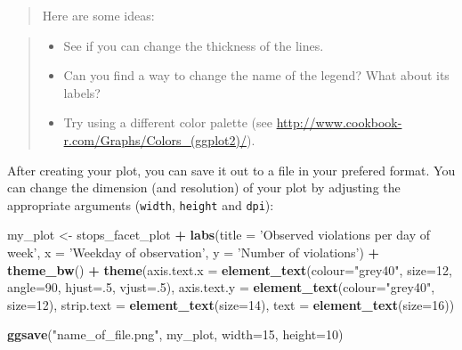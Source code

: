 \documentclass[]{book}
\newenvironment{Shaded}{\begin{snugshade}}{\end{snugshade}}
\newcommand{\KeywordTok}[1]{\textcolor[rgb]{0.13,0.29,0.53}{\textbf{#1}}}
\newcommand{\DataTypeTok}[1]{\textcolor[rgb]{0.13,0.29,0.53}{#1}}
\newcommand{\DecValTok}[1]{\textcolor[rgb]{0.00,0.00,0.81}{#1}}
\newcommand{\StringTok}[1]{\textcolor[rgb]{0.31,0.60,0.02}{#1}}
\newcommand{\OperatorTok}[1]{\textcolor[rgb]{0.81,0.36,0.00}{\textbf{#1}}}
\newcommand{\NormalTok}[1]{#1}
\providecommand{\tightlist}{%
  \setlength{\itemsep}{0pt}\setlength{\parskip}{0pt}}
\theoremstyle{definition}
\theoremstyle{definition}
\theoremstyle{definition}
\theoremstyle{remark}
\begin{document}
\begin{quote}
Here are some ideas:
\end{quote}

\begin{quote}
\begin{itemize}
\tightlist
\item
  See if you can change the thickness of the lines.
\item
  Can you find a way to change the name of the legend? What about its
  labels?
\item
  Try using a different color palette (see
  \url{http://www.cookbook-r.com/Graphs/Colors_(ggplot2)/}).
\end{itemize}
\end{quote}

After creating your plot, you can save it out to a file in your prefered
format. You can change the dimension (and resolution) of your plot by
adjusting the appropriate arguments (\texttt{width}, \texttt{height} and
\texttt{dpi}):

\begin{Shaded}
\begin{Highlighting}[]
\NormalTok{my_plot <-}\StringTok{ }\NormalTok{stops_facet_plot }\OperatorTok{+}
\StringTok{  }\KeywordTok{labs}\NormalTok{(}\DataTypeTok{title =} \StringTok{'Observed violations per day of week'}\NormalTok{,}
         \DataTypeTok{x =} \StringTok{'Weekday of observation'}\NormalTok{,}
         \DataTypeTok{y =} \StringTok{'Number of violations'}\NormalTok{) }\OperatorTok{+}
\StringTok{  }\KeywordTok{theme_bw}\NormalTok{() }\OperatorTok{+}\StringTok{ }
\StringTok{  }\KeywordTok{theme}\NormalTok{(}\DataTypeTok{axis.text.x =} \KeywordTok{element_text}\NormalTok{(}\DataTypeTok{colour=}\StringTok{"grey40"}\NormalTok{, }\DataTypeTok{size=}\DecValTok{12}\NormalTok{, }\DataTypeTok{angle=}\DecValTok{90}\NormalTok{, }\DataTypeTok{hjust=}\NormalTok{.}\DecValTok{5}\NormalTok{, }\DataTypeTok{vjust=}\NormalTok{.}\DecValTok{5}\NormalTok{),}
        \DataTypeTok{axis.text.y =} \KeywordTok{element_text}\NormalTok{(}\DataTypeTok{colour=}\StringTok{"grey40"}\NormalTok{, }\DataTypeTok{size=}\DecValTok{12}\NormalTok{),}
        \DataTypeTok{strip.text =} \KeywordTok{element_text}\NormalTok{(}\DataTypeTok{size=}\DecValTok{14}\NormalTok{),}
        \DataTypeTok{text =} \KeywordTok{element_text}\NormalTok{(}\DataTypeTok{size=}\DecValTok{16}\NormalTok{))}

\KeywordTok{ggsave}\NormalTok{(}\StringTok{"name_of_file.png"}\NormalTok{, my_plot, }\DataTypeTok{width=}\DecValTok{15}\NormalTok{, }\DataTypeTok{height=}\DecValTok{10}\NormalTok{)}
\end{Highlighting}
\end{Shaded}
\end{document}
